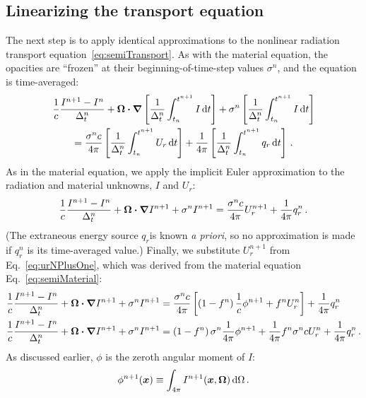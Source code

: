 \subsection{Linearizing the transport equation}
The next step is to apply identical approximations to the nonlinear radiation
transport equation~\eqref{eq:semiTransport}. As with the material equation,
the
opacities are ``frozen'' at their beginning-of-time-step values $\sigma^n$, and
the equation is time-averaged:
\begin{multline*}
  \frac{1}{c} \frac{I^{n+1} - I^n}{\Delta_t^n}
  + \bm{\Omega} \bm{\cdot} \bm{\nabla} \left[
  \frac{1}{\Delta_t^n}\int_{t_n}^{t^{n+1}} I\mathop{}\!\mathrm{d} t
  \right] +
 \sigma^n \left[
  \frac{1}{\Delta_t^n}\int_{t_n}^{t^{n+1}} I\mathop{}\!\mathrm{d} t
  \right]
  \\
  = \frac{\sigma^n c}{4\pi} \left[
  \frac{1}{\Delta_t^n}\int_{t_n}^{t^{n+1}} U_r \mathop{}\!\mathrm{d} t \right]
  + \frac{1}{4\pi}\left[
  \frac{1}{\Delta_t^n}\int_{t_n}^{t^{n+1}} q_r \mathop{}\!\mathrm{d} t \right] \,.
\end{multline*}
As in the material equation, we apply the implicit Euler approximation to the radiation and
material unknowns, $I$ and $U_r$:
\begin{equation*}
  \frac{1}{c} \frac{I^{n+1} - I^n}{\Delta_t^n}
  + \bm{\Omega} \bm{\cdot} \bm{\nabla} I^{n+1}
 + \sigma^n I^{n+1}
 = \frac{\sigma^n c}{4\pi} U_r^{n+1}
  + \frac{1}{4\pi} q_r^n \,.
\end{equation*}
(The extraneous energy source $q_r$is known \emph{a priori}, so no approximation is made if $q_r^n$ is its time-averaged value.)
Finally, we substitute $U_r^{n+1}$ from Eq.~\eqref{eq:urNPlusOne},
which was derived from the material equation Eq.~\eqref{eq:semiMaterial}:
\begin{align}\nonumber
  \frac{1}{c} \frac{I^{n+1} - I^n}{\Delta_t^n}
  + \bm{\Omega} \bm{\cdot} \bm{\nabla} I^{n+1}
 + \sigma^n I^{n+1}
 &= \frac{\sigma^n c}{4\pi} \left[ \left(1 - f^n\right) \frac1c \phi^{n+1} + f^n U_r^n \right]
  + \frac{1}{4\pi} q_r^n
  \\ \label{eq:linearizedGrayTransport}
  \frac{1}{c} \frac{I^{n+1} - I^n}{\Delta_t^n}
  + \bm{\Omega} \bm{\cdot} \bm{\nabla} I^{n+1}
 + \sigma^n I^{n+1}
 &=  \left(1 - f^n\right) \sigma^n \frac{1}{4\pi} \phi^{n+1}
 + \frac{1}{4\pi} f^n \sigma^n c U_r^n
  + \frac{1}{4\pi} q_r^n \,.
\end{align}
As discussed earlier, $\phi$ is the zeroth angular moment of $I$:
\begin{equation*}
  \phi^{n+1}(\bm{x}) \equiv \int_{4\pi} I^{n+1}(\bm{x}, \bm{\Omega}) \mathop{}\!\mathrm{d} \Omega
  \,.
\end{equation*}

